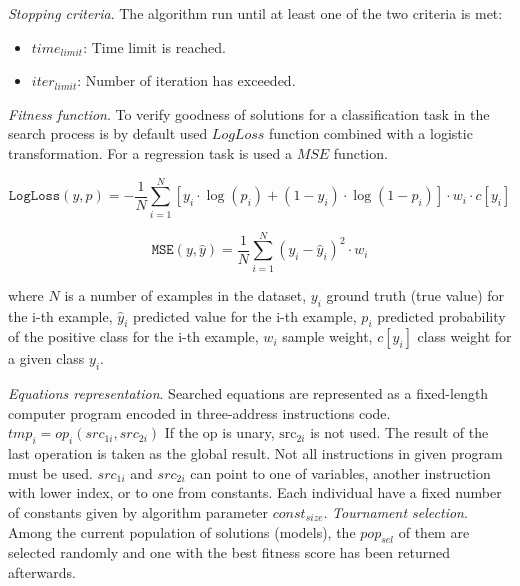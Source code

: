 \documentclass{bmcart}
\begin{document}
\textit{ Stopping criteria}. The algorithm run until at least one of the two criteria is met:
 \begin{itemize}
 	\item  $time_{limit}$: Time limit is reached.
 	\item $iter_{limit}$: Number of iteration has exceeded.
 \end{itemize}

\textit{Fitness function}. To verify goodness of solutions for a classification task in the search process is by default used $LogLoss$ function combined with a logistic transformation. For a regression task is used a $MSE$ function.

\begin{equation}\label{eq:fitness-hroch-classification} 
	\texttt{LogLoss}(y, p) = -\frac{1}{N} \sum_{i=1}^{N} [ y_i \cdot \log(p_i) + (1 - y_i) \cdot \log(1 - p_i) ] \cdot w_i \cdot c[y_i]
\end{equation}

\begin{equation}\label{eq:fitness-hroch-regression} 
\texttt{MSE}(y, \hat{y}) = \frac{1}{N} \sum_{i=1}^{N} (y_i - \hat{y}_i)^2 \cdot w_i
\end{equation}

where $N$ is a number of examples in the dataset, $y_i$ ground truth (true value) for the i-th example, $\hat{y}_i$ predicted value for the i-th example, $p_i$ predicted probability of the positive class for the i-th example, $w_i$ sample weight, $c[y_i]$ class weight for a given class $y_i$.

\textit{Equations representation}. Searched equations are represented as a fixed-length computer program encoded in three-address instructions code. $tmp_{i} = op_i(src_{1i}, src_{2i})$ If the $\text{op}$ is unary, $\text{src}_{2i}$ is not used. The result of the last operation is taken as the global result. Not all instructions in given program must be used. $src_{1i}$ and $src_{2i}$ can point to one of variables, another instruction with lower index, or to one from constants. Each individual have a fixed number of constants given by algorithm parameter $const_{size}$.
\textit{Tournament selection}. Among the current population of solutions (models), the $pop_{sel}$ of them are selected randomly and one with the best fitness score has been returned afterwards.
\end{document}
